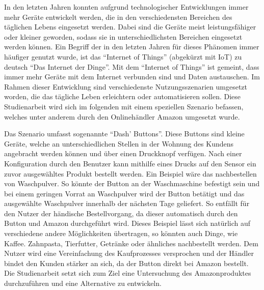 In den letzten Jahren konnten aufgrund technologischer Entwicklungen immer mehr Geräte entwickelt werden, die in den verschiedensten Bereichen des täglichen Lebens eingesetzt werden. Dabei sind die Geräte meist leistungsfähiger oder kleiner geworden, sodass sie in unterschiedlichsten Bereichen eingesetzt werden können. Ein Begriff der in den letzten Jahren für dieses Phänomen immer häufiger genutzt wurde, ist das ``Internet of Things'' (abgekürzt mit IoT) zu deutsch ``Das Internet der Dinge''. Mit dem ``Internet of Things'' ist gemeint, dass immer mehr Geräte mit dem Internet verbunden sind und Daten austauschen. Im Rahmen dieser Entwicklung sind verschiedenste Nutzungsszenarien umgesetzt worden, die das tägliche Leben erleichtern oder automatisieren sollen. Diese Studienarbeit wird sich im folgenden mit einem speziellen Szenario befassen, welches unter anderem durch den Onlinehändler Amazon umgesetzt wurde.

Das Szenario umfasst sogenannte ``Dash' Buttons''. Diese Buttons sind kleine Geräte, welche an unterschiedlichen Stellen in der Wohnung des Kundens angebracht werden können und über einen Druckknopf verfügen. Nach einer Konfiguration durch den Benutzer kann mithilfe eines Drucks auf den Sensor ein zuvor ausgewähltes Produkt bestellt werden. Ein Beispiel wäre das nachbestellen von Waschpulver. So könnte der Button an der Waschmaschine befestigt sein und bei einem geringen Vorrat an Waschpulver wird der Button betätigt und das ausgewählte Waschpulver innerhalb der nächsten Tage geliefert. So entfällt für den Nutzer der händische Bestellvorgang, da dieser automatisch durch den Button und Amazon durchgeführt wird. Dieses Beispiel lässt sich natürlich auf verschiedene andere Möglichkeiten übertragen, so könnten auch Dinge, wie Kaffee. Zahnpasta, Tierfutter, Getränke oder ähnliches nachbestellt werden. Dem Nutzer wird eine Vereinfachung des Kaufprozesses versprochen und der Händler bindet den Kunden stärker an sich, da der Button direkt bei Amazon bestellt. 
Die Studienarbeit setzt sich zum Ziel eine Untersuchung des Amazonproduktes durchzuführen und eine Alternative zu entwickeln. 